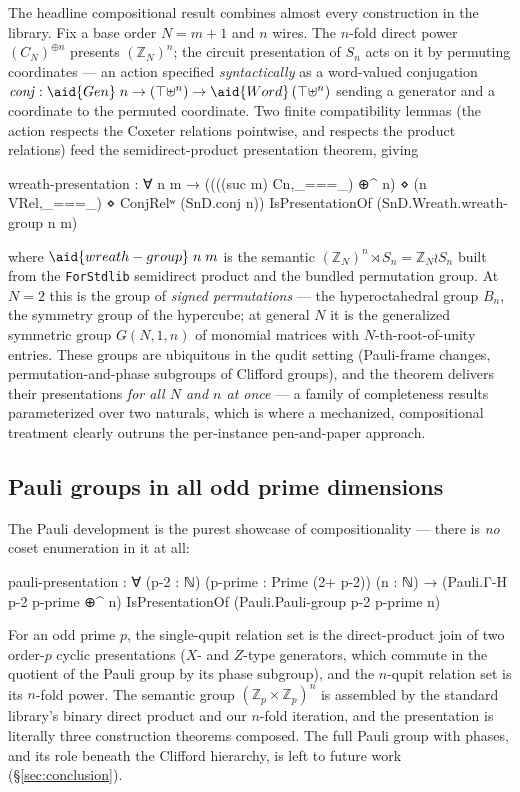 The headline compositional result combines almost every construction in
the library.  Fix a base order $N = m{+}1$ and $n$ wires.  The $n$-fold
direct power $(C_N)^{\oplus n}$ presents $(\mathbb{Z}_N)^n$; the circuit
presentation of $S_n$ acts on it by permuting coordinates --- an action
specified \emph{syntactically} as a word-valued conjugation
$\mathit{conj} : \aid{Gen}\;n \to (\top \uplus^n) \to
\aid{Word}\,(\top \uplus^n)$ sending a generator and a coordinate to the
permuted coordinate.  Two finite compatibility lemmas (the action
respects the Coxeter relations pointwise, and respects the product
relations) feed the semidirect-product presentation theorem, giving
\begin{agdacode}
wreath-presentation : ∀ n m →
  ((((suc m) Cn,_===_) ⊕^ n) ⋄ (n VRel,_===_) ⋄ ConjRelʷ (SnD.conj {n}))
    IsPresentationOf (SnD.Wreath.wreath-group n m)
\end{agdacode}
where $\aid{wreath-group}\;n\;m$ is the semantic
$(\mathbb{Z}_N)^n \rtimes S_n = \mathbb{Z}_N \wr S_n$ built from the
\texttt{ForStdlib} semidirect product and the bundled permutation group.
At $N = 2$ this is the group of \emph{signed permutations} --- the
hyperoctahedral group $B_n$, the symmetry group of the hypercube; at
general $N$ it is the generalized symmetric group $G(N,1,n)$ of monomial
matrices with $N$-th-root-of-unity entries.  These groups are ubiquitous
in the qudit setting (Pauli-frame changes, permutation-and-phase
subgroups of Clifford groups), and the theorem delivers their
presentations \emph{for all $N$ and $n$ at once} --- a family of
completeness results parameterized over two naturals, which is where a
mechanized, compositional treatment clearly outruns the per-instance
pen-and-paper approach.

\subsection{Pauli groups in all odd prime dimensions}\label{sec:pauli}

The Pauli development is the purest showcase of compositionality --- there
is \emph{no} coset enumeration in it at all:

\begin{agdacode}
pauli-presentation :
  ∀ (p-2 : ℕ) (p-prime : Prime (2+ p-2)) (n : ℕ) →
  (Pauli.Γ-H p-2 p-prime ⊕^ n) IsPresentationOf (Pauli.Pauli-group p-2 p-prime n)
\end{agdacode}

For an odd prime $p$, the single-qupit relation set is the direct-product
join of two order-$p$ cyclic presentations ($X$- and $Z$-type generators,
which commute in the quotient of the Pauli group by its phase subgroup),
and the $n$-qupit relation set is its $n$-fold power.  The semantic group
$(\mathbb{Z}_p \times \mathbb{Z}_p)^n$ is assembled by the standard
library's binary direct product and our $n$-fold iteration, and the
presentation is literally three construction theorems composed.  The
full Pauli group with phases, and its role beneath the Clifford
hierarchy, is left to future work (\S\ref{sec:conclusion}).

